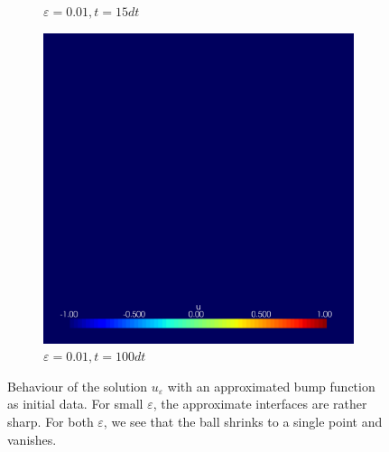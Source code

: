\begin{figure}[h]
\begin{subfigure}[b]{0.3\linewidth}
		\caption{$ \varepsilon = 0.01, t =15 dt $}
	\end{subfigure}
	\hfill
	\begin{subfigure}[b]{0.3\linewidth}
		\includegraphics[width=\linewidth]{numerical_simulation/bump/eps_0.01000101.vtu}
		\caption{$ \varepsilon = 0.01, t =  100 dt $}
	\end{subfigure}
	
	\caption{Behaviour of the solution $u_{ \varepsilon } $ with an 
	approximated bump function as initial data. For small $ \varepsilon $, the 
	approximate interfaces are rather sharp. For both $ \varepsilon $, we see 
	that 
	the ball shrinks to a single point and vanishes.}
	\label{numerical_simulation_bump}
\end{figure}

